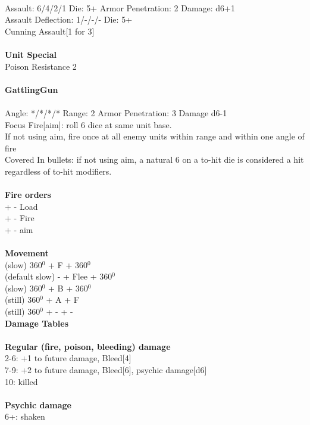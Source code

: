 \ \\
Assault: 6/4/2/1 Die: 5+ Armor Penetration: 2 Damage: d6+1 \\
Assault Deflection: 1/-/-/- Die: 5+\\
\indent Cunning Assault[1 for 3] \\
\ \\

{\bf Unit Special} \\
Poison Resistance 2
\ \\
\ \\
{\bf GattlingGun } \\
\ \\
Angle: */*/*/* Range: 2 Armor Penetration: 3 Damage d6-1 \\
\indent Focus Fire[aim]: roll 6 dice at same unit base. \\ If not using aim, fire once at all enemy units within range and within one angle of fire \\ Covered In bullets: if not using aim, a natural 6 on a to-hit die is considered a hit regardless of to-hit modifiers. \\





\ \\ {\bf Fire orders } \\
+ - Load \\
+ - Fire \\
+ - aim \\
\ \\ {\bf Movement } \\
(slow) 360$^0$ + F + 360$^0$ \\
(default slow) - + Flee + 360$^0$ \\
(slow) 360$^0$ + B + 360$^0$ \\
(still) 360$^0$ + A + F \\
(still) 360$^0$ + - + - \\



{\bf Damage Tables} \\
\ \\ {\bf Regular (fire, poison, bleeding) damage } \\
2-6: +1 to future damage, Bleed[4] \\
7-9: +2 to future damage, Bleed[6], psychic damage[d6] \\
10: killed \\
\ \\ {\bf Psychic damage } \\
6+: shaken \\


